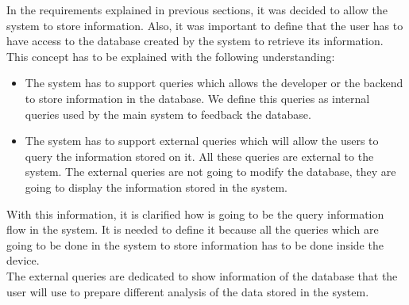 In the requirements explained in previous sections, it was decided to allow the system to store information. Also, it was important to define that the user has to have access to the database created by the system to retrieve its information.\\

This concept has to be explained with the following understanding:

\begin{itemize}
\item The system has to support queries which allows the developer or the backend to store information in the database. We define this queries as internal queries used by the main system to feedback the database.
\item The system has to support external queries which will allow the users to query the information stored on it. All these queries are external to the system. The external queries are not going to modify the database, they are going to display the information stored in the system.
\end{itemize}

With this information, it is clarified how is going to be the query information flow in the system. It is needed to define it because all the queries which are going to be done in the system to store information has to be done inside the device.\\

The external queries are dedicated to show information of the database that the user will use to prepare different analysis of the data stored in the system.

\newpage
\newpage

